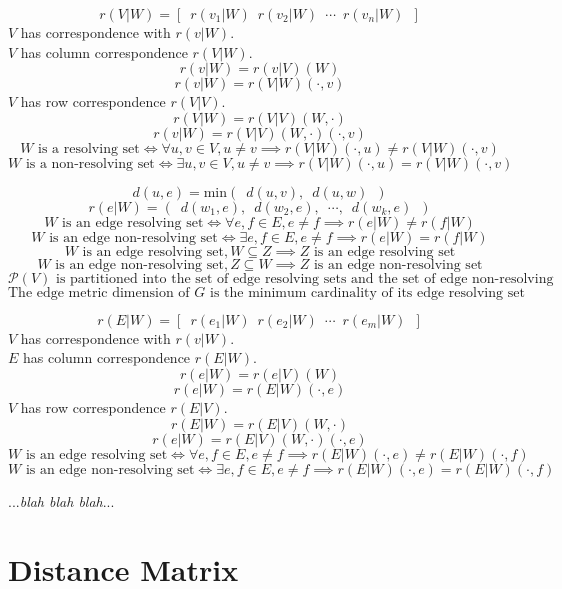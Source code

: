 \documentclass{article}
\begin{document}
\[ r(V|W) = \left[\enspace r(v_1|W)\enspace r(v_2|W)\enspace \cdots\enspace r(v_n|W)\enspace \right] \]
\(V\) has correspondence with \(r(v|W)\). \\
\(V\) has column correspondence \(r(V|W)\).
\[ r(v|W) = r(v|V)(W) \]
\[ r(v|W) = r(V|W)(\cdot, v) \]
\(V\) has row correspondence \(r(V|V)\).
\[ r(V|W) = r(V|V)(W, \cdot) \]
\[ r(v|W) = r(V|V)(W, \cdot)(\cdot, v) \]
\[ W \text{ is a resolving set} \iff \forall u, v \in V, u \neq v \implies r(V|W)(\cdot, u) \neq r(V|W)(\cdot, v) \]
\[ W \text{ is a non-resolving set} \iff \exists u, v \in V, u \neq v \implies r(V|W)(\cdot, u) = r(V|W)(\cdot, v) \]

\[ d(u, e) = \textrm{min}(\enspace d(u, v),\enspace d(u, w)\enspace ) \]
\[ r(e|W) = (\enspace d(w_1, e),\enspace d(w_2, e),\enspace \cdots,\enspace d(w_k, e)\enspace ) \]
\[ W \text{ is an edge resolving set} \iff \forall e, f \in E, e \neq f \implies r(e|W) \neq r(f|W) \]
\[ W \text{ is an edge non-resolving set} \iff \exists e, f \in E, e \neq f \implies r(e|W) = r(f|W) \]
\[ W \text{ is an edge resolving set}, W \subseteq Z \implies Z \text{ is an edge resolving set} \]
\[ W \text{ is an edge non-resolving set}, Z \subseteq W \implies Z \text{ is an edge non-resolving set} \]
\[ \mathcal{P}(V) \text{ is partitioned into the set of edge resolving sets and the set of edge non-resolving sets} \]
\[ \text{The edge metric dimension of } G \text{ is the minimum cardinality of its edge resolving set} \]

\[ r(E|W) = \left[\enspace r(e_1|W)\enspace r(e_2|W)\enspace \cdots\enspace r(e_m|W)\enspace \right] \]
\(V\) has correspondence with \(r(v|W)\). \\
\(E\) has column correspondence \(r(E|W)\).
\[ r(e|W) = r(e|V)(W) \]
\[ r(e|W) = r(E|W)(\cdot, e) \]
\(V\) has row correspondence \(r(E|V)\).
\[ r(E|W) = r(E|V)(W, \cdot) \]
\[ r(e|W) = r(E|V)(W, \cdot)(\cdot, e) \]
\[ W \text{ is an edge resolving set} \iff \forall e, f \in E, e \neq f \implies r(E|W)(\cdot, e) \neq r(E|W)(\cdot, f) \]
\[ W \text{ is an edge non-resolving set} \iff \exists e, f \in E, e \neq f \implies r(E|W)(\cdot, e) = r(E|W)(\cdot, f) \]

...\textit{blah blah blah}...

\clearpage
\section{Distance Matrix}
\end{document}
